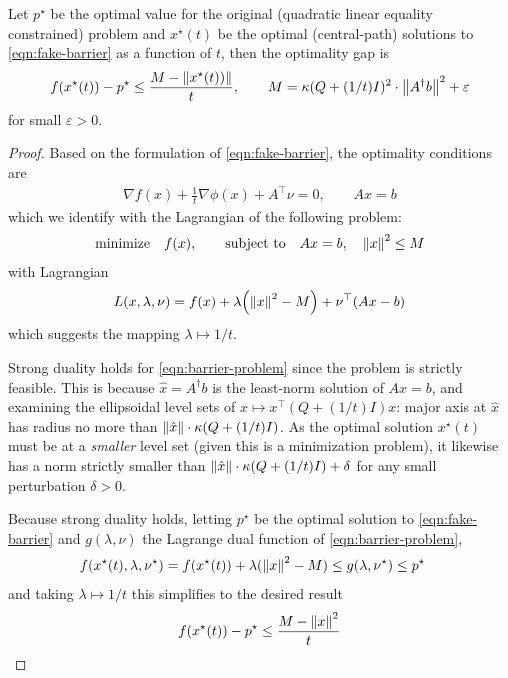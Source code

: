 \documentclass[12pt]{article}
\begin{document}
\begin{theorem}
  Let \(p^\star\) be the optimal value for the
  original (quadratic linear equality constrained)
  problem and \(x^\star (t)\) be the optimal (central-path) solutions to
  \eqref{eqn:fake-barrier} as a function of \(t\), then
  the optimality gap is
  \begin{align*}
    f(x^\star (t)) - p^\star \leq \frac{M - {\left\lVert x^\star (t))\right\rVert}}{t},
      \qquad M = \kappa(Q + (1/t)I) ^2 \cdot {\left\lVert A^\dagger b\right\rVert}^2
              + \varepsilon
  \end{align*}
  for small \(\varepsilon > 0\).
\end{theorem}
\begin{proof}
  Based on the formulation of \eqref{eqn:fake-barrier},
  the optimality conditions are
  \begin{align*}
    \nabla f(x) + \frac{1}{t} \nabla \phi(x) + A^\top \nu = 0,
      \qquad
      Ax = b
  \end{align*}
  which we identify with the Lagrangian of the following problem:
  \begin{align}
    \text{minimize} \quad f(x),
      \qquad \text{subject to} \quad Ax = b, \quad {\left\lVert x\right\rVert}^2 \leq M
      \label{eqn:barrier-problem}
  \end{align}
  with Lagrangian
  \begin{align*}
    L(x, \lambda, \nu)
      = f(x) + \lambda {\left({\left\lVert x\right\rVert}^2 - M\right)} + \nu^\top (Ax - b)
  \end{align*}
  which suggests the mapping \(\lambda \mapsto 1/t\).
  
  Strong duality holds for \eqref{eqn:barrier-problem}
  since the problem is strictly feasible.
  This is because \(\hat{x} = A^\dagger b\) is the least-norm solution
  of \(Ax = b\),
  and examining the ellipsoidal level sets of
  \(x \mapsto x^\top (Q + (1/t) I) x\):
  major axis at \(\hat{x}\) has radius no more than
  \({\left\lVert\hat{x}\right\rVert} \cdot \kappa (Q + (1/t) I)\).
  As the optimal solution \(x^\star (t)\) must be at a \textit{smaller}
  level set (given this is a minimization problem),
  it likewise has a norm strictly smaller than
  \({\left\lVert\hat{x}\right\rVert} \cdot \kappa (Q + (1/t) I) + \delta\)
  for any small perturbation \(\delta > 0\).
  
  Because strong duality holds, letting \(p^\star\) be the optimal solution
  to \eqref{eqn:fake-barrier} and \(g(\lambda, \nu)\)
  the Lagrange dual function
  of \eqref{eqn:barrier-problem},
  \begin{align*}
    f(x^\star (t), \lambda, \nu^\star)
      = f(x^\star(t)) + \lambda ({\left\lVert x\right\rVert}^2 - M)
      &\leq g(\lambda, \nu^\star) \leq p^\star
  \end{align*}
  and taking \(\lambda \mapsto 1 / t\) this simplifies to the desired result
  \begin{align*}
    f(x^\star (t)) - p^\star
      \leq \frac{M - {\left\lVert x\right\rVert}^2}{t}
  \end{align*}
  

\end{proof}

\printbibliography
\end{document}
